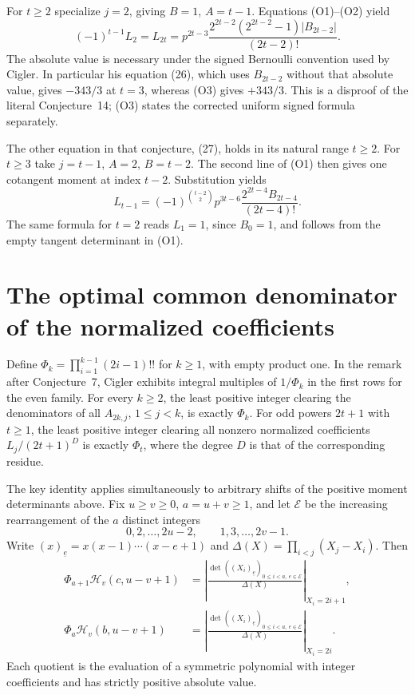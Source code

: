 \documentclass[11pt,a4paper]{article}
\begin{document}
For $t\ge2$ specialize $j=2$, giving $B=1$, $A=t-1$. Equations (O1)--(O2) yield
\[
 (-1)^{t-1}L_2=L_{2t}
 =p^{2t-3}\frac{2^{2t-2}(2^{2t-2}-1)|B_{2t-2}|}{(2t-2)!}.
 \tag{O3}
\]
The absolute value is necessary under the signed Bernoulli convention used by Cigler. In particular his equation (26), which uses $B_{2t-2}$ without that absolute value, gives $-343/3$ at $t=3$, whereas (O3) gives $+343/3$. This is a disproof of the literal Conjecture~14; (O3) states the corrected uniform signed formula separately.

The other equation in that conjecture, (27), holds in its natural range $t\ge2$. For $t\ge3$ take $j=t-1$, $A=2$, $B=t-2$. The second line of (O1) then gives one cotangent moment at index $t-2$. Substitution yields
\[
 L_{t-1}=(-1)^{\binom{t-2}{2}}
 p^{3t-6}\frac{2^{2t-4}B_{2t-4}}{(2t-4)!}.
\]
The same formula for $t=2$ reads $L_1=1$, since $B_0=1$, and follows from the empty tangent determinant in (O1).

\section{The optimal common denominator of the normalized coefficients}
Define $\Phi_k=\prod_{i=1}^{k-1}(2i-1)!!$ for $k\ge1$, with empty product one. In the remark after Conjecture~7, Cigler exhibits integral multiples of $1/\Phi_k$ in the first rows for the even family. For every $k\ge2$, the least positive integer clearing the denominators of all $A_{2k,j}$, $1\le j<k$, is exactly $\Phi_k$. For odd powers $2t+1$ with $t\ge1$, the least positive integer clearing all nonzero normalized coefficients $L_j/(2t+1)^{D}$ is exactly $\Phi_t$, where the degree $D$ is that of the corresponding residue.

The key identity applies simultaneously to arbitrary shifts of the positive moment determinants above. Fix $u\ge v\ge0$, $a=u+v\ge1$, and let $\mathcal E$ be the increasing rearrangement of the $a$ distinct integers
\[
 0,2,\ldots,2u-2,\qquad 1,3,\ldots,2v-1.
\]
Write $(x)_{\underline e}=x(x-1)\cdots(x-e+1)$ and $\Delta(X)=\prod_{i<j}(X_j-X_i)$. Then
\[
\begin{aligned}
 \Phi_{a+1}\mathcal H_v(c,u-v+1)
 &=\left|\frac{\det((X_i)_{\underline e})_{0\le i<a,\ e\in\mathcal E}}{\Delta(X)}\right|_{X_i=2i+1},\\
 \Phi_a\mathcal H_v(b,u-v+1)
 &=\left|\frac{\det((X_i)_{\underline e})_{0\le i<a,\ e\in\mathcal E}}{\Delta(X)}\right|_{X_i=2i}.
\end{aligned}
\]
Each quotient is the evaluation of a symmetric polynomial with integer coefficients and has strictly positive absolute value.
\end{document}
